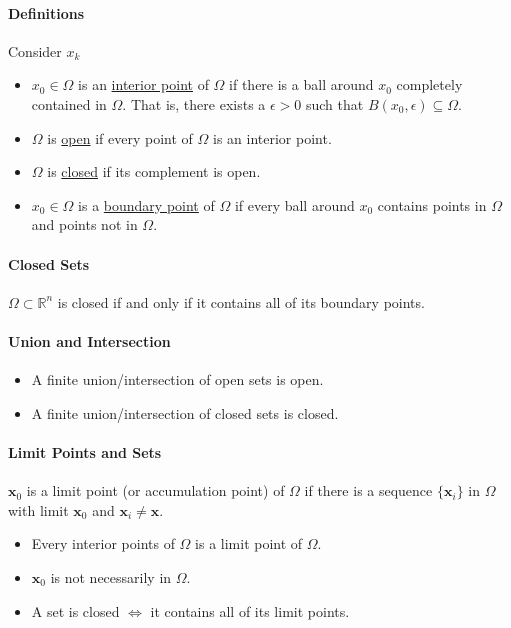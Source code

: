 \paragraph{Definitions}
Consider \(x_k\)
\begin{itemize}
    \item \(x_0\in\Omega\) is an \underline{interior point} of \(\Omega\) if there is a ball around \(x_0\) completely contained in \(\Omega\). That is, there exists a \(\epsilon > 0\) such that \(B(x_0, \epsilon) \subseteq \Omega\).
    \item  \(\Omega\) is \underline{open} if every point of \(\Omega\) is an interior point.
    \item \(\Omega\) is \underline{closed} if its complement is open.
    \item \(x_0\in\Omega\) is a \underline{boundary point} of \(\Omega\) if every ball around \(x_0\) contains points in \(\Omega\) and points not in \(\Omega\).
\end{itemize}

\paragraph{Closed Sets}
\(\Omega\subset\mathbb{R}^n\) is closed if and only if it contains all of its boundary points.

\paragraph{Union and Intersection}
\begin{itemize}
    \item A finite union/intersection of open sets is open.
    \item A finite union/intersection of closed sets is closed.
\end{itemize}

\paragraph{Limit Points and Sets}
\(\textbf{x}_0\) is a limit point (or accumulation point) of \(\Omega\) if there is a sequence \(\{\textbf{x}_i\}\) 
in \(\Omega\) with limit \(\textbf{x}_0\) and \(\textbf{x}_i \neq \textbf{x}\).

\begin{itemize}
    \item Every interior points of \(\Omega\) is a limit point of \(\Omega\).
    \item \(\textbf{x}_0\) is not necessarily in \(\Omega\).
    \item A set is closed \(\Leftrightarrow\) it contains all of its limit points.
\end{itemize}

